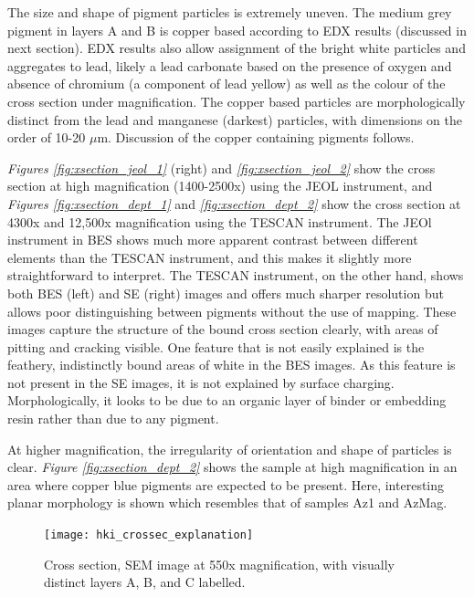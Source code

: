 The size and shape of pigment particles is extremely uneven. The medium grey pigment in layers A and B is copper based according to EDX results (discussed in next section). EDX results also allow assignment of the bright white particles and aggregates to lead, likely a lead carbonate based on the presence of oxygen and absence of chromium (a component of lead yellow) as well as the colour of the cross section under magnification. The copper based particles are morphologically distinct from the lead and manganese (darkest) particles, with dimensions on the order of 10-20 $\mu$m. Discussion of the copper containing pigments follows.

\textit{Figures \ref{fig:xsection_jeol_1}} (right) and \textit{\ref{fig:xsection_jeol_2}} show the cross section at high magnification (1400-2500x) using the JEOL instrument, and \textit{Figures \ref{fig:xsection_dept_1}} and \textit{\ref{fig:xsection_dept_2}} show the cross section at 4300x and 12,500x magnification using the TESCAN instrument. The JEOl instrument in BES shows much more apparent contrast between different elements than the TESCAN instrument, and this makes it slightly more straightforward to interpret. The TESCAN instrument, on the other hand, shows both BES (left) and SE (right) images and offers much sharper resolution but allows poor distinguishing between pigments without the use of mapping. These images capture the structure of the bound cross section clearly, with areas of pitting and cracking visible. One feature that is not easily explained is the feathery, indistinctly bound areas of white in the BES images. As this feature is not present in the SE images, it is not explained by surface charging. Morphologically, it looks to be due to an organic layer of binder or embedding resin rather than due to any pigment.

At higher magnification, the irregularity of orientation and shape of particles is clear. \textit{Figure \ref{fig:xsection_dept_2}} shows the sample at high magnification in an area where copper blue pigments are expected to be present. Here, interesting planar morphology is shown which resembles that of samples Az1 and AzMag.

\begin{figure}[H]
\centering
  \texttt{[image: hki\_crossec\_explanation]}
\caption[Cross section with visually distinct layers A, B, and C labelled]{Cross section, SEM image at 550x magnification, with visually distinct layers A, B, and C labelled.}
\label{fig:hki_crossec_explanation}
\end{figure}

